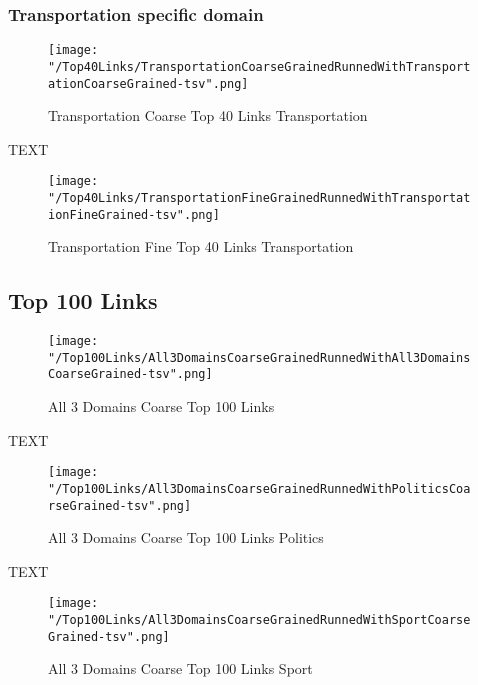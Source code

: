 \documentclass[thesis=M,english]{FITthesis}[2018/05/30]
\begin{document}
	\subsubsection{Transportation specific domain}
	\begin{figure}[H]\centering
		\texttt{[image: "/Top40Links/TransportationCoarseGrainedRunnedWithTransportationCoarseGrained-tsv".png]}
		\caption{Transportation Coarse Top 40 Links Transportation}\label{}
	\end{figure}		
	
		TEXT	

	\begin{figure}[H]\centering
		\texttt{[image: "/Top40Links/TransportationFineGrainedRunnedWithTransportationFineGrained-tsv".png]}
		\caption{Transportation Fine Top 40 Links Transportation}\label{}	
	\end{figure}

\subsection{Top 100 Links}

	\begin{figure}[H]\centering
		\texttt{[image: "/Top100Links/All3DomainsCoarseGrainedRunnedWithAll3DomainsCoarseGrained-tsv".png]}
		\caption{All 3 Domains Coarse Top 100 Links}\label{}
	\end{figure}

	TEXT

	\begin{figure}[H]\centering
		\texttt{[image: "/Top100Links/All3DomainsCoarseGrainedRunnedWithPoliticsCoarseGrained-tsv".png]}
		\caption{All 3 Domains Coarse Top 100 Links Politics}\label{}
	\end{figure}	

	TEXT	

	\begin{figure}[H]\centering
		\texttt{[image: "/Top100Links/All3DomainsCoarseGrainedRunnedWithSportCoarseGrained-tsv".png]}
		\caption{All 3 Domains Coarse Top 100 Links Sport}\label{}
	\end{figure}
	
\end{document}
